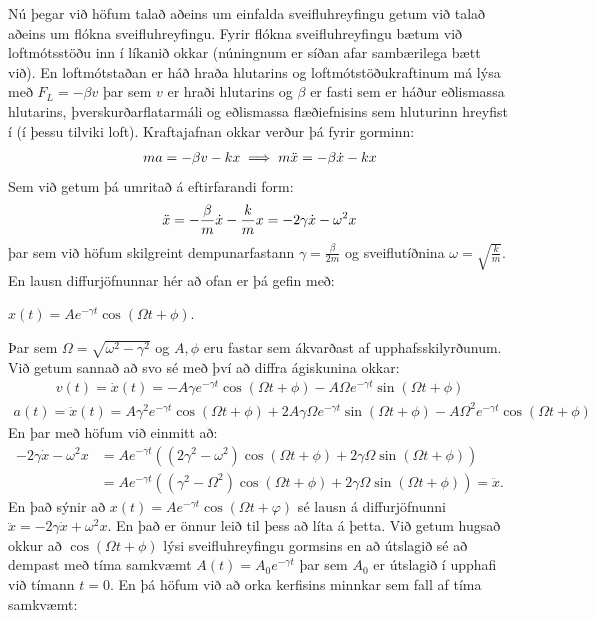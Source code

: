 Nú þegar við höfum talað aðeins um einfalda sveifluhreyfingu getum við talað aðeins um flókna sveifluhreyfingu. Fyrir flókna sveifluhreyfingu bætum við loftmótsstöðu inn í líkanið okkar (núningnum er síðan afar sambærilega bætt við). En loftmótstaðan er háð hraða hlutarins og loftmótstöðukraftinum má lýsa með $F_L = -\beta v$ þar sem $v$ er hraði hlutarins og $\beta$ er fasti sem er háður eðlismassa hlutarins, þverskurðarflatarmáli og eðlismassa flæðiefnisins sem hluturinn hreyfist í (í þessu tilviki loft). Kraftajafnan okkar verður þá fyrir gorminn:
\begin{align*}
    ma = -\beta v - kx \implies m\Ddot{x} = -\beta \dot{x} - kx
\end{align*}
Sem við getum þá umritað á eftirfarandi form:
\begin{align*}
    \Ddot{x} = - \frac{\beta}{m}\dot{x} - \frac{k}{m}x = -2\gamma \dot{x} - \omega^2 x
\end{align*}
þar sem við höfum skilgreint dempunarfastann $\gamma = \frac{\beta}{2m}$ og sveiflutíðnina $\omega = \sqrt{\frac{k}{m}}$. En lausn diffurjöfnunnar hér að ofan er þá gefin með:
\begin{center}
\begin{tcbox}[nobeforeafter]{$x(t) = Ae^{-\gamma t} \cos(\Omega t + \phi).$}
\end{tcbox}
\end{center}
Þar sem $\Omega = \sqrt{\omega^2 - \gamma^2}$ og $A, \phi$ eru fastar sem ákvarðast af upphafsskilyrðunum. Við getum sannað að svo sé með því að diffra ágiskunina okkar:
\begin{align*}
    v(t) = \dot{x}(t) = -A\gamma e^{-\gamma t}\cos(\Omega t + \phi) - A\Omega e^{-\gamma t}\sin(\Omega t + \phi)
\end{align*}
\begin{align*}
    a(t) = \ddot{x}(t) = A\gamma^2 e^{-\gamma t}\cos(\Omega t + \phi) + 2A\gamma \Omega e^{-\gamma t}\sin(\Omega t + \phi) - A\Omega^2 e^{-\gamma t}\cos(\Omega t + \phi)
\end{align*}
En þar með höfum við einmitt að:
\begin{align*}
    -2\gamma \dot{x} - \omega^2 x &= Ae^{-\gamma t} \left( \left( 2\gamma^2  -\omega^2 \right)\cos(\Omega t + \phi) + 2\gamma \Omega \sin(\Omega t + \phi) \right) \\
    &= Ae^{-\gamma t} \left( \left( \gamma^2  -\Omega^2 \right)\cos(\Omega t + \phi) + 2\gamma \Omega \sin(\Omega t + \phi) \right) = \ddot{x}.
\end{align*}
En það sýnir að $x(t) = Ae^{-\gamma t}\cos(\Omega t + \varphi)$ sé lausn á diffurjöfnunni $\ddot{x} = -2\gamma \dot{x} + \omega^2 x$. En það er önnur leið til þess að líta á þetta. Við getum hugsað okkur að $\cos(\Omega t + \phi)$ lýsi sveifluhreyfingu gormsins en að útslagið sé að dempast með tíma samkvæmt $A(t) = A_0 e^{-\gamma t}$ þar sem $A_0$ er útslagið í upphafi við tímann $t = 0$. En þá höfum við að orka kerfisins minnkar sem fall af tíma samkvæmt:

